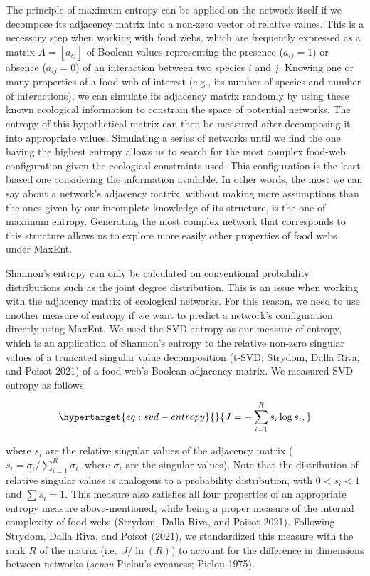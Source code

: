 \documentclass[11pt]{article}
\begin{document}
The principle of maximum entropy can be applied on the network itself if
we decompose its adjacency matrix into a non-zero vector of relative
values. This is a necessary step when working with food webs, which are
frequently expressed as a matrix \(A = [a_{ij}]\) of Boolean values
representing the presence (\(a_{ij} = 1\)) or absence (\(a_{ij} = 0\))
of an interaction between two species \(i\) and \(j\). Knowing one or
many properties of a food web of interest (e.g., its number of species
and number of interactions), we can simulate its adjacency matrix
randomly by using these known ecological information to constrain the
space of potential networks. The entropy of this hypothetical matrix can
then be measured after decomposing it into appropriate values.
Simulating a series of networks until we find the one having the highest
entropy allows us to search for the most complex food-web configuration
given the ecological constraints used. This configuration is the least
biased one considering the information available. In other words, the
most we can say about a network's adjacency matrix, without making more
assumptions than the ones given by our incomplete knowledge of its
structure, is the one of maximum entropy. Generating the most complex
network that corresponds to this structure allows us to explore more
easily other properties of food webs under MaxEnt.

Shannon's entropy can only be calculated on conventional probability
distributions such as the joint degree distribution. This is an issue
when working with the adjacency matrix of ecological networks. For this
reason, we need to use another measure of entropy if we want to predict
a network's configuration directly using MaxEnt. We used the SVD entropy
as our measure of entropy, which is an application of Shannon's entropy
to the relative non-zero singular values of a truncated singular value
decomposition (t-SVD; Strydom, Dalla Riva, and Poisot 2021) of a food
web's Boolean adjacency matrix. We measured SVD entropy as follows:

\begin{equation}\protect\hypertarget{eq:svd-entropy}{}{J = -\sum_{i=1}^R s_i \log s_i,}\label{eq:svd-entropy}\end{equation}

where \(s_i\) are the relative singular values of the adjacency matrix
(\(s_i = \sigma_i / \sum_{i = 1}^R \sigma_i\), where \(\sigma_i\) are
the singular values). Note that the distribution of relative singular
values is analogous to a probability distribution, with \(0 < s_i < 1\)
and \(\sum s_i = 1\). This measure also satisfies all four properties of
an appropriate entropy measure above-mentioned, while being a proper
measure of the internal complexity of food webs (Strydom, Dalla Riva,
and Poisot 2021). Following Strydom, Dalla Riva, and Poisot (2021), we
standardized this measure with the rank \(R\) of the matrix
(i.e.~\(J / \ln(R)\)) to account for the difference in dimensions
between networks (\emph{sensu} Pielou's evenness; Pielou 1975).
\end{document}
